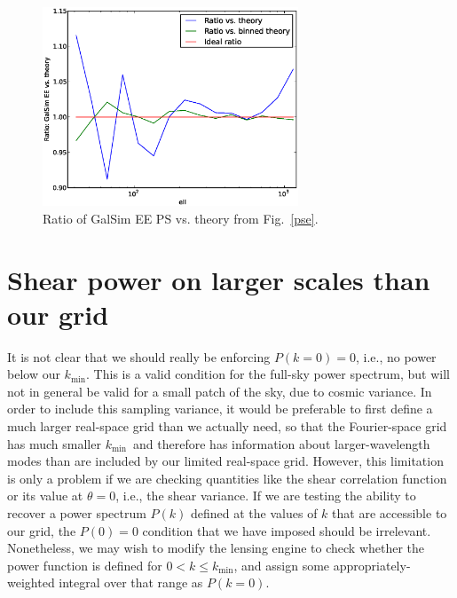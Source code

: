 \documentclass[preprint]{aastex}
\newcommand{\kmin}{\ensuremath{k_\mathrm{min}}}
\begin{document}
\begin{figure}
\begin{center}
\includegraphics[width=3in]{../external/test_gridshear/output/compare_input_pe.pse.ratio.eps}
\caption{Ratio of GalSim EE PS vs. theory from Fig.~\ref{pse}.\label{pse-ratio}}
\end{center}
\end{figure}

\section{Shear power on larger scales than our grid}\label{S:pk0}

It is not clear that we should really be enforcing $P(k=0)=0$, i.e., no
power below our \kmin.  This is a valid condition for the full-sky
power spectrum, but will not in general be valid for a small patch of
the sky, due to cosmic variance.  In order to include this sampling
variance, it would be preferable to first define a much larger
real-space grid than we actually need, so that the Fourier-space grid has much smaller
\kmin\ and therefore has information about larger-wavelength modes
than are included by our limited real-space grid.  However, this limitation is only a
problem if we are checking quantities like the shear correlation
function or its value at $\theta=0$, i.e., the shear variance.  If we
are testing the ability to recover a power spectrum $P(k)$ defined at
the values of $k$ that are accessible to our grid, the $P(0)=0$
condition that we have imposed should be irrelevant. 
Nonetheless, we may wish to modify the lensing engine to check whether
the power function is defined for $0< k\le\kmin$, and assign some
appropriately-weighted integral over that range as $P(k=0)$.
\end{document}
